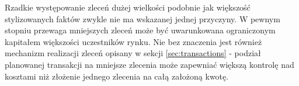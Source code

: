 Rzadkie występowanie zleceń dużej wielkości podobnie jak większość stylizowanych faktów zwykle nie ma wskazanej jednej przyczyny. W pewnym stopniu przewaga mniejszych zleceń może być uwarunkowana ograniczonym kapitałem większości uczestników rynku. Nie bez znaczenia jest również mechanizm realizacji zleceń opisany w sekcji \ref{sec:transactions} - podział planowanej transakcji na mniejsze zlecenia może zapewniać większą kontrolę nad kosztami niż złożenie jednego zlecenia na całą założoną kwotę. 






